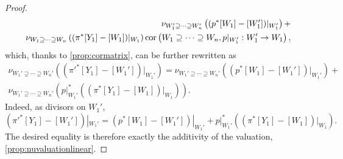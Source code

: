 \begin{proof}
\[\begin{split}
        \nu_{W_1'\supseteq \cdots \supseteq W_n'}\left((p^*[W_1]-[W_1'])|_{W_1'}\right)+\\
        \nu_{W_1\supseteq \cdots \supseteq W_n}\left((\pi^*[Y_1]-[W_1])|_{W_1}\right)\operatorname{cor}\left(W_1\supseteq \cdots \supseteq W_n,p|_{W_1'}:W_1'\rightarrow W_1\right),
    \end{split}
    \]
    which, thanks to \cref{prop:cormatrix}, can be further rewritten as
    \[
    \begin{split}
    \nu_{W_1'\supseteq \cdots \supseteq W_n'}\left((\pi'^*[Y_1]-[W_1'])|_{W_1'}\right)=
        \nu_{W_1'\supseteq \cdots \supseteq W_n'}\left((p^*[W_1]-[W_1'])|_{W_1'}\right)+\\
        \nu_{W_1'\supseteq \cdots \supseteq W_n'}\left(p|_{W_1'}^*\left((\pi^*[Y_1]-[W_1])|_{W_1} \right)\right).
    \end{split}
    \]
    Indeed, as divisors on $W_1'$,
    \[
        (\pi'^*[Y_1]-[W_1'])|_{W_1'}=(p^*[W_1]-[W_1'])|_{W_1'}+p|_{W_1'}^*((\pi^*[Y_1]-[W_1])|_{W_1}).
    \]
    The desired equality is therefore exactly the additivity of the valuation, \cref{prop:nuvaluationlinear}.
\end{proof}

